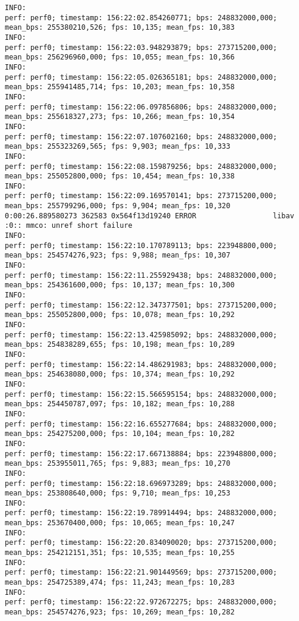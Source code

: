 \documentclass[12pt,oneside]{book}
\begin{document}
\begin{lstlisting}
INFO:
perf: perf0; timestamp: 156:22:02.854260771; bps: 248832000,000; mean_bps: 255380210,526; fps: 10,135; mean_fps: 10,383
INFO:
perf: perf0; timestamp: 156:22:03.948293879; bps: 273715200,000; mean_bps: 256296960,000; fps: 10,055; mean_fps: 10,366
INFO:
perf: perf0; timestamp: 156:22:05.026365181; bps: 248832000,000; mean_bps: 255941485,714; fps: 10,203; mean_fps: 10,358
INFO:
perf: perf0; timestamp: 156:22:06.097856806; bps: 248832000,000; mean_bps: 255618327,273; fps: 10,266; mean_fps: 10,354
INFO:
perf: perf0; timestamp: 156:22:07.107602160; bps: 248832000,000; mean_bps: 255323269,565; fps: 9,903; mean_fps: 10,333
INFO:
perf: perf0; timestamp: 156:22:08.159879256; bps: 248832000,000; mean_bps: 255052800,000; fps: 10,454; mean_fps: 10,338
INFO:
perf: perf0; timestamp: 156:22:09.169570141; bps: 273715200,000; mean_bps: 255799296,000; fps: 9,904; mean_fps: 10,320
0:00:26.889580273 362583 0x564f13d19240 ERROR                  libav :0:: mmco: unref short failure
INFO:
perf: perf0; timestamp: 156:22:10.170789113; bps: 223948800,000; mean_bps: 254574276,923; fps: 9,988; mean_fps: 10,307
INFO:
perf: perf0; timestamp: 156:22:11.255929438; bps: 248832000,000; mean_bps: 254361600,000; fps: 10,137; mean_fps: 10,300
INFO:
perf: perf0; timestamp: 156:22:12.347377501; bps: 273715200,000; mean_bps: 255052800,000; fps: 10,078; mean_fps: 10,292
INFO:
perf: perf0; timestamp: 156:22:13.425985092; bps: 248832000,000; mean_bps: 254838289,655; fps: 10,198; mean_fps: 10,289
INFO:
perf: perf0; timestamp: 156:22:14.486291983; bps: 248832000,000; mean_bps: 254638080,000; fps: 10,374; mean_fps: 10,292
INFO:
perf: perf0; timestamp: 156:22:15.566595154; bps: 248832000,000; mean_bps: 254450787,097; fps: 10,182; mean_fps: 10,288
INFO:
perf: perf0; timestamp: 156:22:16.655277684; bps: 248832000,000; mean_bps: 254275200,000; fps: 10,104; mean_fps: 10,282
INFO:
perf: perf0; timestamp: 156:22:17.667138884; bps: 223948800,000; mean_bps: 253955011,765; fps: 9,883; mean_fps: 10,270
INFO:
perf: perf0; timestamp: 156:22:18.696973289; bps: 248832000,000; mean_bps: 253808640,000; fps: 9,710; mean_fps: 10,253
INFO:
perf: perf0; timestamp: 156:22:19.789914494; bps: 248832000,000; mean_bps: 253670400,000; fps: 10,065; mean_fps: 10,247
INFO:
perf: perf0; timestamp: 156:22:20.834090020; bps: 273715200,000; mean_bps: 254212151,351; fps: 10,535; mean_fps: 10,255
INFO:
perf: perf0; timestamp: 156:22:21.901449569; bps: 273715200,000; mean_bps: 254725389,474; fps: 11,243; mean_fps: 10,283
INFO:
perf: perf0; timestamp: 156:22:22.972672275; bps: 248832000,000; mean_bps: 254574276,923; fps: 10,269; mean_fps: 10,282

\end{lstlisting}
\end{document}
